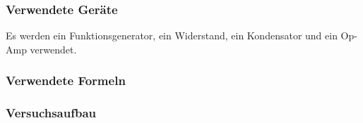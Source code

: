 \documentclass[12pt,a4paper]{article}
\begin{document}
\subsubsection{Verwendete Geräte}

Es werden ein Funktionsgenerator, ein Widerstand, ein Kondensator und ein Op-Amp verwendet.

\subsubsection{Verwendete Formeln}
\subsubsection{Versuchsaufbau}
\end{document}
